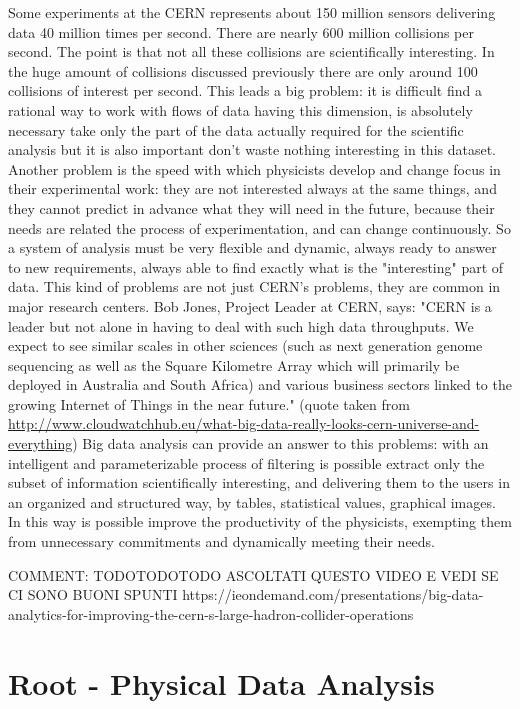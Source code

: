 Some experiments at the CERN represents about 150 million sensors delivering data 40 million times per second. There are nearly 600 million collisions per second. The point is that not all these collisions are scientifically interesting. In the huge amount of collisions discussed previously there are only around 100 collisions of interest per second.
This leads a big problem: it is difficult find a rational way to work with flows of data having this dimension, is absolutely necessary take only the part of the data actually required for the scientific analysis but it is also important don't waste nothing interesting in this dataset.
Another problem is the speed with which physicists develop and change focus in their experimental work: they are not interested always at the same things, and they cannot predict in advance what they will need in the future, because their needs are related the process of experimentation, and can change continuously. So a system of analysis must be very flexible and dynamic, always ready to answer to new requirements, always able to find exactly what is the "interesting" part of data.  
This kind of problems are not just CERN's problems, they are common in major research centers. Bob Jones, Project Leader at CERN, says:
"CERN is a leader but not alone in having to deal with such high data throughputs. We expect to see similar scales in other sciences (such as next generation genome sequencing as well as the Square Kilometre Array which will primarily be deployed in Australia and South Africa) and various business sectors linked to the growing Internet of Things in the near future."
(quote taken from \url{http://www.cloudwatchhub.eu/what-big-data-really-looks-cern-universe-and-everything}) 
Big data analysis can provide an answer to this problems: with an intelligent and parameterizable process of filtering is possible extract only the subset of information scientifically interesting, and delivering them to the users in an organized and structured way, by tables, statistical values, graphical images. 
In this way is possible improve the productivity of the physicists, exempting them from unnecessary commitments and dynamically meeting their needs. 

COMMENT:
TODOTODOTODO ASCOLTATI QUESTO VIDEO E VEDI SE CI SONO BUONI SPUNTI
https://ieondemand.com/presentations/big-data-analytics-for-improving-the-cern-s-large-hadron-collider-operations

\section{Root - Physical Data Analysis }

